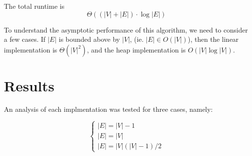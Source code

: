 \documentclass[technote]{IEEEtran}
\begin{document}
The total runtime is 
$$\Theta ( (|V| + |E|) \cdot \log|E| )$$


To understand the asymptotic performance of this algorithm, 
we need to consider a few cases.
If $|E|$ is bounded above by $|V|$, (ie. $|E| \in O(|V|)$), 
then the linear implementation is $\Theta(|V|^2)$, 
and the heap implementation is $O(|V| \log |V|)$.



\section{Results}

An analysis of each implmentation was tested for 
three cases, namely: 

$$
\begin{cases}
    |E| = |V| - 1\\
    |E| = |V|  \\
    |E| = |V|(|V| - 1)/2
\end{cases}
$$
\end{document}

